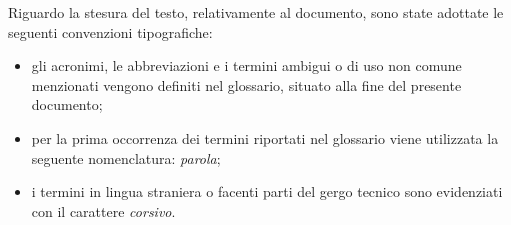 Riguardo la stesura del testo, relativamente al documento, sono state adottate le seguenti convenzioni tipografiche:
\begin{itemize}
	\item gli acronimi, le abbreviazioni e i termini ambigui o di uso non comune menzionati vengono definiti nel glossario, situato alla fine del presente documento;
	\item per la prima occorrenza dei termini riportati nel glossario viene utilizzata la seguente nomenclatura: \emph{parola}\glsfirstoccur;
	\item i termini in lingua straniera o facenti parti del gergo tecnico sono evidenziati con il carattere \emph{corsivo}.
\end{itemize}
